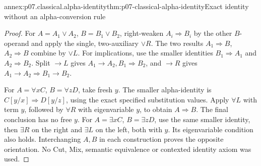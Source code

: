 \begin{annexitem}{annex:p07.classical.alpha-identity}{thm:p07-classical-alpha-identity}{Exact identity without an alpha-conversion rule}
\begin{proof}
For \(A=A_1\lor A_2\), \(B=B_1\lor B_2\), right-weaken
\(A_i\Rightarrow B_i\) by the other \(B\)-operand and apply the
single, two-auxiliary \(\lor R\). The two results
\(A_1\Rightarrow B\), \(A_2\Rightarrow B\) combine by \(\lor L\).
For implications, use the smaller identities
\(B_1\Rightarrow A_1\) and \(A_2\Rightarrow B_2\).
Split \(\to L\) gives \(A_1\to A_2,B_1\Rightarrow B_2\), and
\(\to R\) gives \(A_1\to A_2\Rightarrow B_1\to B_2\).

For \(A=\forall xC\), \(B=\forall zD\), take fresh \(y\).
The smaller alpha-identity is
\(C[y/x]\Rightarrow D[y/z]\), using the exact specified substitution
values. Apply \(\forall L\) with term \(y\), followed by
\(\forall R\) with eigenvariable \(y\), to obtain \(A\Rightarrow B\).
The final conclusion has no free \(y\).
For \(A=\exists xC\), \(B=\exists zD\), use the same smaller identity,
then \(\exists R\) on the right and \(\exists L\) on the left, both
with \(y\). Its eigenvariable condition also holds. Interchanging
\(A,B\) in each construction proves the opposite orientation.
No Cut, Mix, semantic equivalence or contexted identity axiom was used.
\end{proof}
\end{annexitem}

